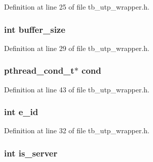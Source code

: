 Definition at line 25 of file tb\-\_\-utp\-\_\-wrapper.\-h.

\hypertarget{structtb__utp__wrapper__t_af22ff4ab7a026e6c3b4b08eafb2df027}{
\subsubsection[{buffer\-\_\-size}]{\setlength{\rightskip}{0pt plus 5cm}int buffer\-\_\-size}}\label{structtb__utp__wrapper__t_af22ff4ab7a026e6c3b4b08eafb2df027}


Definition at line 29 of file tb\-\_\-utp\-\_\-wrapper.\-h.

\hypertarget{structtb__utp__wrapper__t_a41d4de1455ed50839baec9be13941163}{
\subsubsection[{cond}]{\setlength{\rightskip}{0pt plus 5cm}pthread\-\_\-cond\-\_\-t$\ast$ cond}}\label{structtb__utp__wrapper__t_a41d4de1455ed50839baec9be13941163}


Definition at line 43 of file tb\-\_\-utp\-\_\-wrapper.\-h.

\hypertarget{structtb__utp__wrapper__t_ae2ab59af76be940892170990721a0832}{
\subsubsection[{e\-\_\-id}]{\setlength{\rightskip}{0pt plus 5cm}int e\-\_\-id}}\label{structtb__utp__wrapper__t_ae2ab59af76be940892170990721a0832}


Definition at line 32 of file tb\-\_\-utp\-\_\-wrapper.\-h.

\hypertarget{structtb__utp__wrapper__t_a16d6097ae8087fb54d727dbee6e315c9}{
\subsubsection[{is\-\_\-server}]{\setlength{\rightskip}{0pt plus 5cm}int is\-\_\-server}}\label{structtb__utp__wrapper__t_a16d6097ae8087fb54d727dbee6e315c9}


